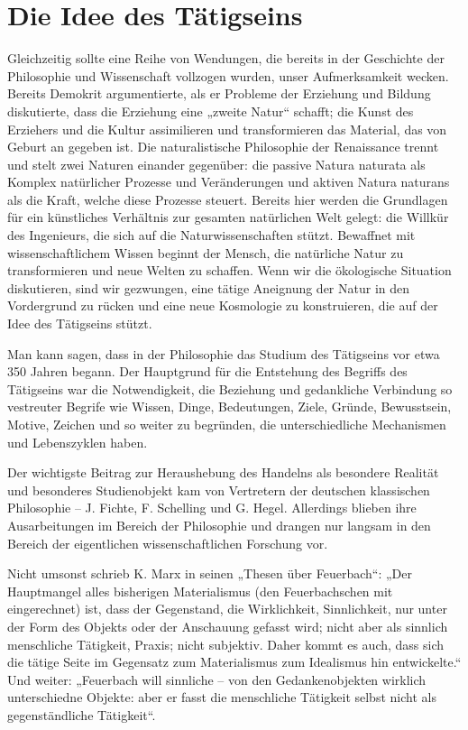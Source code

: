 \documentclass[11pt,a4paper]{article}
\begin{document}
\section{Die Idee des Tätigseins}

Gleichzeitig sollte eine Reihe von Wendungen, die bereits in der Geschichte
der Philosophie und Wissenschaft vollzogen wurden, unser Aufmerksamkeit
wecken. Bereits Demokrit argumentierte, als er Probleme der Erziehung und
Bildung diskutierte, dass die Erziehung eine „zweite Natur“ schafft; die Kunst
des Erziehers und die Kultur assimilieren und transformieren das Material, das
von Geburt an gegeben ist. Die naturalistische Philosophie der Renaissance
trennt und stelt zwei Naturen einander gegenüber: die passive Natura naturata
als Komplex natürlicher Prozesse und Veränderungen und aktiven Natura naturans
als die Kraft, welche diese Prozesse steuert. Bereits hier werden die
Grundlagen für ein künstliches Verhältnis zur gesamten natürlichen Welt
gelegt: die Willkür des Ingenieurs, die sich auf die Naturwissenschaften
stützt. Bewaffnet mit wissenschaftlichem Wissen beginnt der Mensch, die
natürliche Natur zu transformieren und neue Welten zu schaffen. Wenn wir die
ökologische Situation diskutieren, sind wir gezwungen, eine tätige Aneignung
der Natur in den Vordergrund zu rücken und eine neue Kosmologie zu
konstruieren, die auf der Idee des Tätigseins stützt.

Man kann sagen, dass in der Philosophie das Studium des Tätigseins vor etwa
350 Jahren begann. Der Hauptgrund für die Entstehung des Begriffs des
Tätigseins war die Notwendigkeit, die Beziehung und gedankliche Verbindung so
vestreuter Begrife wie Wissen, Dinge, Bedeutungen, Ziele, Gründe, Bewusstsein,
Motive, Zeichen und so weiter zu begründen, die unterschiedliche Mechanismen
und Lebenszyklen haben.

Der wichtigste Beitrag zur Heraushebung des Handelns als besondere Realität
und besonderes Studienobjekt kam von Vertretern der deutschen klassischen
Philosophie -- J. Fichte, F. Schelling und G. Hegel. Allerdings blieben ihre
Ausarbeitungen im Bereich der Philosophie und drangen nur langsam in den
Bereich der eigentlichen wissenschaftlichen Forschung vor.

Nicht umsonst schrieb K. Marx in seinen „Thesen über Feuerbach“: „Der
Hauptmangel alles bisherigen Materialismus (den Feuerbachschen mit
eingerechnet) ist, dass der Gegenstand, die Wirklichkeit, Sinnlichkeit, nur
unter der Form des Objekts oder der Anschauung gefasst wird; nicht aber als
sinnlich menschliche Tätigkeit, Praxis; nicht subjektiv. Daher kommt es auch,
dass sich die tätige Seite im Gegensatz zum Materialismus zum Idealismus hin
entwickelte.“ Und weiter: „Feuerbach will sinnliche -- von den
Gedankenobjekten wirklich unterschiedne Objekte: aber er fasst die menschliche
Tätigkeit selbst nicht als gegenständliche Tätigkeit“.
\end{document}
